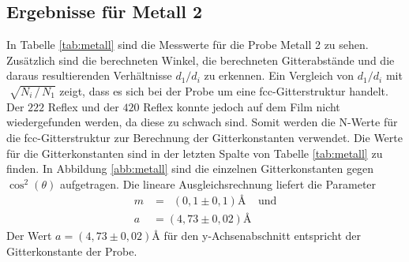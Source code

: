 \subsection{Ergebnisse für Metall 2}

In Tabelle \ref{tab:metall} sind die Messwerte für die Probe Metall 2 zu sehen. Zusätzlich sind die berechneten Winkel, die berechneten Gitterabstände und die
daraus resultierenden Verhältnisse $d_1 / d_i$ zu erkennen.\newline
Ein Vergleich von $d_1 / d_i$ mit $\sqrt[]{N_i\, / \, N_1}$ zeigt, dass es sich bei der Probe um eine fcc-Gitterstruktur handelt. Der $222$ Reflex und
der $420$ Reflex konnte jedoch auf dem Film nicht wiedergefunden werden, da diese zu schwach sind.
Somit werden die
N-Werte für die fcc-Gitterstruktur zur Berechnung der Gitterkonstanten verwendet. Die Werte für die Gitterkonstanten sind in der letzten Spalte von
Tabelle \ref{tab:metall} zu finden. In Abbildung \ref{abb:metall} sind die einzelnen Gitterkonstanten gegen $\cos^2(\theta)$ aufgetragen. Die lineare Ausgleichsrechnung liefert
die Parameter
\begin{align*}
  m &= \,\,\,\left(0,1\pm0,1\right)\si{\angstrom}~~~~~\text{und}\\
  a &= \left(4,73\pm0,02\right)\si{\angstrom}
\end{align*}
Der Wert $a = \left(4,73\pm0,02\right)\si{\angstrom}$ für den y-Achsenabschnitt entspricht der Gitterkonstante der Probe.


